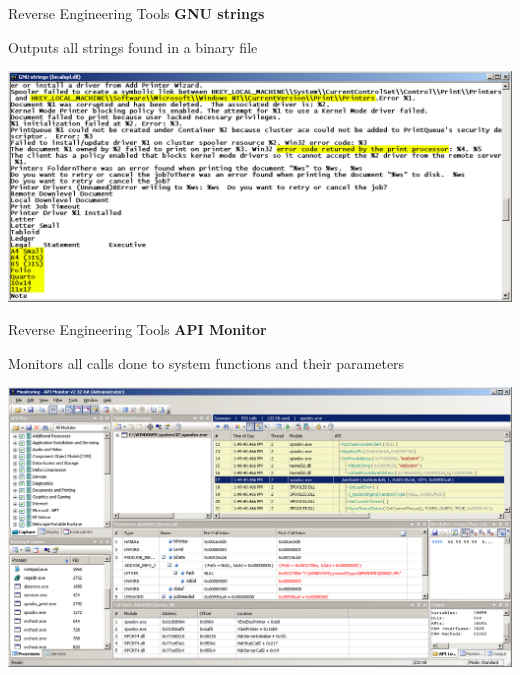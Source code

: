 \documentclass[aspectratio=1610]{beamer}
\newcommand\myheading[1]{{\Large\bfseries#1}\par\bigskip}
\begin{document}
\begin{frame}{Reverse Engineering Tools}
	\myheading{GNU strings}
	
	Outputs all strings found in a binary file
	\bigskip
	
	\centering
	\includegraphics{pictures/strings}
\end{frame}

\begin{frame}{Reverse Engineering Tools}
	\myheading{API Monitor}
	
	Monitors all calls done to system functions and their parameters
	\bigskip
	
	\centering
	\includegraphics{pictures/apimon}
\end{frame}
\end{document}
